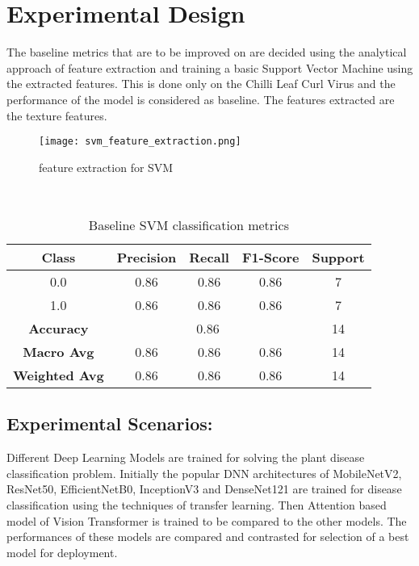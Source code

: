 \section{Experimental Design}
 
The baseline metrics that are to be improved on are decided using the analytical approach of feature extraction and training a basic Support Vector Machine using the extracted features. This is done only on the Chilli Leaf Curl Virus and the performance of the model is considered as baseline. The features extracted are the texture features.

\begin{figure}[h!]
    \centering
    \texttt{[image: svm\_feature\_extraction.png]}
    \caption{feature extraction for SVM}
    \label{fig:svm_feature_extraction}
\end{figure}

\

\begin{table}[h!]
    \centering
    \begin{tabular}{|c|c|c|c|c|}
    \hline
    \textbf{Class} & \textbf{Precision} & \textbf{Recall} & \textbf{F1-Score} & \textbf{Support} \\ \hline
    0.0            & 0.86               & 0.86            & 0.86              & 7                \\ \hline
    1.0            & 0.86               & 0.86            & 0.86              & 7                \\ \hline
    \textbf{Accuracy}   & \multicolumn{3}{c|}{0.86}                         & 14               \\ \hline
    \textbf{Macro Avg}  & 0.86               & 0.86            & 0.86              & 14               \\ \hline
    \textbf{Weighted Avg} & 0.86               & 0.86            & 0.86              & 14               \\ \hline
    \end{tabular}
    \caption{Baseline SVM classification metrics}
    \label{tab:svm_classification_report}
\end{table}

\subsection{Experimental Scenarios:} 

Different Deep Learning Models are trained for solving the plant disease classification problem. Initially the popular DNN architectures of MobileNetV2, ResNet50, EfficientNetB0, InceptionV3 and DenseNet121 are trained for disease classification using the techniques of transfer learning. Then Attention based model of Vision Transformer is trained to be compared to the other models. The performances of these models are compared and contrasted for selection of a best model for deployment.

